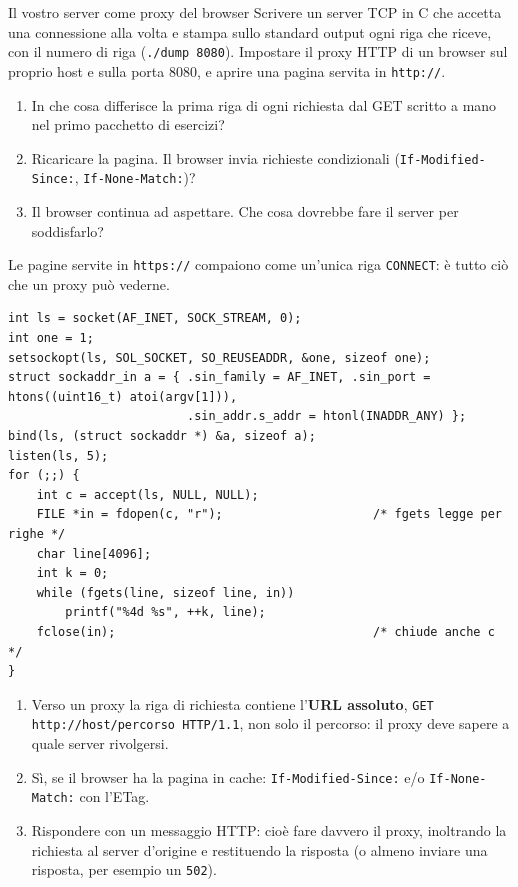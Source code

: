 \begin{esercizio}{Il vostro server come proxy del browser}
Scrivere un server TCP in C che accetta una connessione alla volta e stampa sullo standard output ogni riga che riceve, con il numero di
riga (\texttt{./dump 8080}). Impostare il proxy HTTP di un browser sul proprio host e sulla porta 8080, e aprire una pagina servita in
\texttt{http://}.
\begin{enumerate}[label=(\alph*)]
    \item In che cosa differisce la prima riga di ogni richiesta dal GET scritto a mano nel primo pacchetto di esercizi?
    \item Ricaricare la pagina. Il browser invia richieste condizionali (\texttt{If-Modified-Since:}, \texttt{If-None-Match:})?
    \item Il browser continua ad aspettare. Che cosa dovrebbe fare il server per soddisfarlo?
\end{enumerate}
Le pagine servite in \texttt{https://} compaiono come un'unica riga \texttt{CONNECT}: è tutto ciò che un proxy può vederne.

\svolgimento
\begin{lstlisting}[language={[POSIX]C}]
int ls = socket(AF_INET, SOCK_STREAM, 0);
int one = 1;
setsockopt(ls, SOL_SOCKET, SO_REUSEADDR, &one, sizeof one);
struct sockaddr_in a = { .sin_family = AF_INET, .sin_port = htons((uint16_t) atoi(argv[1])),
                         .sin_addr.s_addr = htonl(INADDR_ANY) };
bind(ls, (struct sockaddr *) &a, sizeof a);
listen(ls, 5);
for (;;) {
    int c = accept(ls, NULL, NULL);
    FILE *in = fdopen(c, "r");                     /* fgets legge per righe */
    char line[4096];
    int k = 0;
    while (fgets(line, sizeof line, in))
        printf("%4d %s", ++k, line);
    fclose(in);                                    /* chiude anche c */
}
\end{lstlisting}
\begin{enumerate}[label=(\alph*)]
    \item Verso un proxy la riga di richiesta contiene l'\textbf{URL assoluto}, \texttt{GET http://host/percorso HTTP/1.1}, non solo il
          percorso: il proxy deve sapere a quale server rivolgersi.
    \item Sì, se il browser ha la pagina in cache: \texttt{If-Modified-Since:} e/o \texttt{If-None-Match:} con l'ETag.
    \item Rispondere con un messaggio HTTP: cioè fare davvero il proxy, inoltrando la richiesta al server d'origine e restituendo la
          risposta (o almeno inviare una risposta, per esempio un \texttt{502}).
\end{enumerate}
\end{esercizio}


